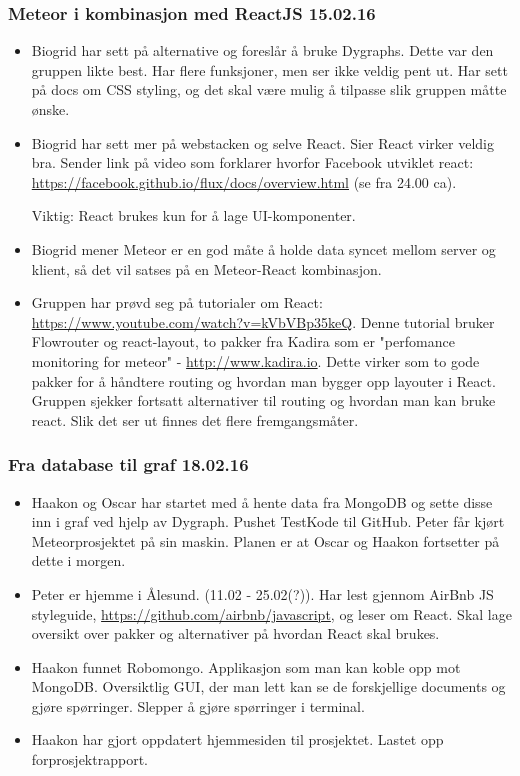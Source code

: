 \documentclass[12pt, oneside]{article}
\begin{document}
\subsubsection{Meteor i kombinasjon med ReactJS 15.02.16}
\begin{itemize}
	\item Biogrid har sett på alternative og foreslår å bruke Dygraphs. Dette var den gruppen likte best. Har flere funksjoner, men ser ikke veldig pent 		ut. Har sett på 		docs om CSS styling, og det skal være mulig å tilpasse slik gruppen måtte ønske.
	\item Biogrid har sett mer på webstacken og selve React. Sier React virker veldig bra. Sender link på video som forklarer hvorfor Facebook 			utviklet react: 		\url{https://facebook.github.io/flux/docs/overview.html} (se fra 24.00 ca).
	
		Viktig: React brukes kun for å lage UI-komponenter.
	\item Biogrid mener Meteor er en god måte å holde data syncet mellom server og klient, så det vil satses på en Meteor-React kombinasjon. 
	\item Gruppen har prøvd seg på tutorialer om React:\\
		\url{https://www.youtube.com/watch?v=kVbVBp35keQ}. Denne tutorial bruker Flowrouter og react-layout, to pakker fra Kadira som er "perfomance monitoring for 			meteor" - \url{http://www.kadira.io}. Dette virker som to gode pakker for å håndtere routing og hvordan man bygger opp layouter i React. Gruppen sjekker fortsatt alternativer 		til routing og hvordan man kan bruke react. Slik det ser ut finnes det flere fremgangsmåter.
\end{itemize}



\subsubsection{Fra database til graf 18.02.16}
\begin{itemize}
	\item Haakon og Oscar har startet med å hente data fra MongoDB og sette disse inn i graf ved hjelp av Dygraph. Pushet TestKode til GitHub. Peter får kjørt 			Meteorprosjektet på sin maskin. Planen er at Oscar og Haakon fortsetter på dette i morgen.
	\item Peter er hjemme i Ålesund. (11.02 - 25.02(?)). Har lest gjennom AirBnb JS styleguide, \url{https://github.com/airbnb/javascript}, og leser om React. Skal lage oversikt over pakker og alternativer på hvordan 		React skal brukes.
	\item Haakon funnet Robomongo. Applikasjon som man kan koble opp mot MongoDB. Oversiktlig GUI, der man lett kan se de forskjellige documents og gjøre 				spørringer. Slepper å gjøre spørringer i terminal.
	\item Haakon har gjort oppdatert hjemmesiden til prosjektet. Lastet opp forprosjektrapport. 
\end{itemize}
\end{document}
